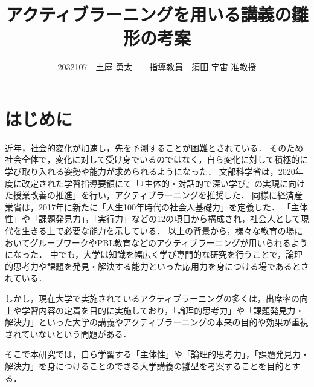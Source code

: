 \documentclass[twocolumn,10pt,a4j]{ltjsarticle}
\title{アクティブラーニングを用いる講義の雛形の考案}
\author{2032107　土屋 勇太　　指導教員　須田 宇宙 准教授}
\date{}
\begin{document}
\maketitle

\section{はじめに}

近年，社会的変化が加速し，先を予測することが困難とされている．
そのため社会全体で，変化に対して受け身でいるのではなく，自ら変化に対して積極的に学び取り入れる姿勢や能力が求められるようになった．
文部科学省は，2020年度に改定された学習指導要領にて「『主体的・対話的で深い学び』の実現に向けた授業改善の推進」を行い，アクティブラーニングを推奨した．
同様に経済産業省は，2017年に新たに「人生100年時代の社会人基礎力」を定義した．
「主体性」や「課題発見力」，「実行力」などの12の項目から構成され，社会人として現代を生きる上で必要な能力を示している．
以上の背景から，様々な教育の場においてグループワークやPBL教育などのアクティブラーニングが用いられるようになった．
中でも，大学は知識を幅広く学び専門的な研究を行うことで，論理的思考力や課題を発見・解決する能力といった応用力を身につける場であるとされている\cite{daigaku}．

しかし，現在大学で実施されているアクティブラーニングの多くは，出席率の向上や学習内容の定着を目的に実施しており，「論理的思考力」や「課題発見力・解決力」といった大学の講義やアクティブラーニングの本来の目的や効果が重視されていないという問題がある．

そこで本研究では，自ら学習する「主体性」や「論理的思考力」，「課題発見力・解決力」を身につけることのできる大学講義の雛型を考案することを目的とする．
\end{document}
